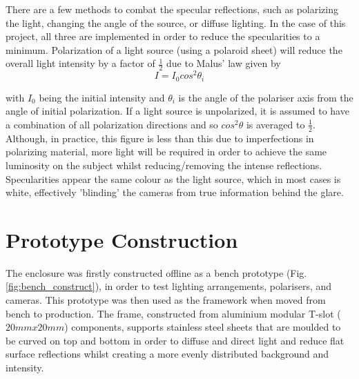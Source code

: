 \documentclass[fleqn,twoside,12pt]{report}
\begin{document}
There are a few methods to combat the specular reflections, such as polarizing the light, changing the angle of the source, or diffuse lighting. In the case of this project, all three are implemented in order to reduce the specularities to a minimum. Polarization of a light source (using a polaroid sheet) will reduce the overall light intensity by a factor of $\frac{1}{2}$ due to Malus' law given by
\begin{equation}
	I = I_{0} cos^{2}\theta_{i}
\end{equation}

with $I_{0}$ being the initial intensity and $\theta_{i}$ is the angle of the polariser axis from the angle of initial polarization. If a light source is unpolarized, it is assumed to have a combination of all polarization directions and so $cos^{2}\theta$ is averaged to $\frac{1}{2}$. Although, in practice, this figure is less than this due to imperfections in polarizing material, more light will be required in order to achieve the same luminosity on the subject \cite{rox, sommer} whilst reducing/removing the intense reflections. Specularities appear the same colour as the light source, which in most cases is white, effectively 'blinding' the cameras from true information behind the glare.  






\section{Prototype Construction}
\label{sec:prototype_contruct}

The enclosure was firstly constructed offline as a bench prototype (Fig. \ref{fig:bench_construct}), in order to test lighting arrangements, polarisers, and cameras. This prototype was then used as the framework when moved from bench to production. The frame, constructed from aluminium modular T-slot ($20mmx20mm$) components, supports stainless steel sheets that are moulded to be curved on top and bottom in order to diffuse and direct light and reduce flat surface reflections whilst creating a more evenly distributed background and intensity. 
\end{document}

